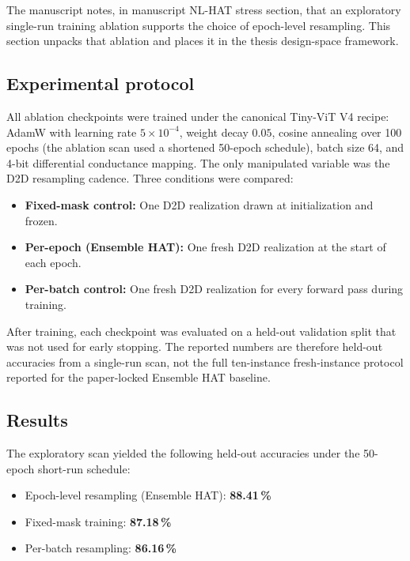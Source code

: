 The manuscript notes, in manuscript NL-HAT stress section, that an exploratory single-run training ablation supports the choice of epoch-level resampling. This section unpacks that ablation and places it in the thesis design-space framework.

\subsection{Experimental protocol}

All ablation checkpoints were trained under the canonical Tiny-ViT V4 recipe: AdamW with learning rate $5\times10^{-4}$, weight decay $0.05$, cosine annealing over 100 epochs (the ablation scan used a shortened 50-epoch schedule), batch size 64, and 4-bit differential conductance mapping. The only manipulated variable was the D2D resampling cadence. Three conditions were compared:

\begin{itemize}[leftmargin=1.4em]
    \item \textbf{Fixed-mask control:} One D2D realization drawn at initialization and frozen.
    \item \textbf{Per-epoch (Ensemble HAT):} One fresh D2D realization at the start of each epoch.
    \item \textbf{Per-batch control:} One fresh D2D realization for every forward pass during training.
\end{itemize}

After training, each checkpoint was evaluated on a held-out validation split that was not used for early stopping. The reported numbers are therefore held-out accuracies from a single-run scan, not the full ten-instance fresh-instance protocol reported for the paper-locked Ensemble HAT baseline.

\subsection{Results}

The exploratory scan yielded the following held-out accuracies under the 50-epoch short-run schedule:
\begin{itemize}[leftmargin=1.4em]
    \item Epoch-level resampling (Ensemble HAT): \textbf{88.41\,\%}
    \item Fixed-mask training: \textbf{87.18\,\%}
    \item Per-batch resampling: \textbf{86.16\,\%}
\end{itemize}

